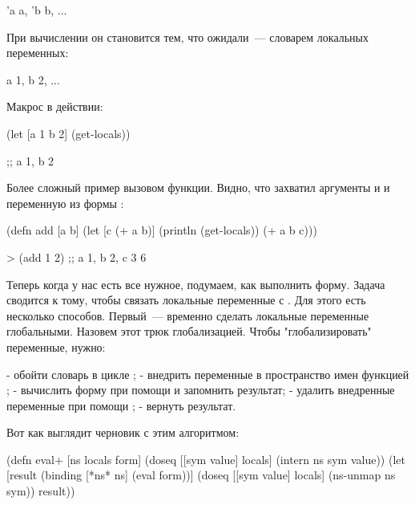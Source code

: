 \begin{english}
  \begin{clojure}
{'a a, 'b b, ...}
  \end{clojure}
\end{english}

При вычислении он становится тем, что ожидали~--- словарем локальных переменных:

\begin{english}
  \begin{clojure}
{a 1, b 2, ...}
  \end{clojure}
\end{english}

Макрос в действии:

\begin{english}
  \begin{clojure}
(let [a 1
      b 2]
  (get-locals))

;; {a 1, b 2}
  \end{clojure}
\end{english}

Более сложный пример вызовом функции. Видно, что  захватил аргументы  и  и переменную  из формы :

\begin{english}
  \begin{clojure}
(defn add [a b]
  (let [c (+ a b)]
    (println (get-locals))
    (+ a b c)))

> (add 1 2)
;; {a 1, b 2, c 3}
6
  \end{clojure}
\end{english}

Теперь когда у нас есть все нужное, подумаем, как выполнить форму. Задача сводится к тому, чтобы связать локальные переменные с . Для этого есть несколько способов. Первый~--- временно сделать локальные переменные глобальными. Назовем этот трюк глобализацией. Чтобы "глобализировать" переменные, нужно:

- обойти словарь  в цикле ;
- внедрить переменные в пространство имен функцией ;
- вычислить форму при помощи  и запомнить результат;
- удалить внедренные переменные при помощи ;
- вернуть результат.

Вот как выглядит черновик  с этим алгоритмом:

\begin{english}
  \begin{clojure}
(defn eval+ [ns locals form]
  (doseq [[sym value] locals]
    (intern ns sym value))
  (let [result
        (binding [*ns* ns]
          (eval form))]
    (doseq [[sym value] locals]
      (ns-unmap ns sym))
    result))
  \end{clojure}
\end{english}


